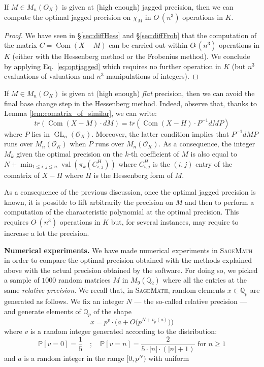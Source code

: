 \documentclass{sig-alternate-05-2015}
\DeclareMathOperator{\GL}{GL}
\DeclareMathOperator{\val}{val}
\DeclareMathOperator{\com}{Com}
\newcommand{\Q}{\mathbb Q}
\newcommand{\OK}{\mathcal{O}_K}
\newcommand{\softO}{O\tilde{~}}
\begin{document}
\begin{prop} \label{prop:optimal_jagged}
If $M \in M_n(O_K)$ is given at (high enough) jagged precision, 
then we can compute the optimal jagged precision on $\chi_M$ in 
$\softO (n^3)$ operations in $K$.
\end{prop}

\begin{proof}
We have seen in \S \ref{sec:diffHess} and \S \ref{sec:diffFrob}
that the computation of the matrix $C = \com(X{-}M)$ can be carried out 
within $\softO(n^3)$ operations in $K$ (either with the Hessenberg 
method or the Frobenius method). We conclude by applying 
Eq.~\eqref{eq:optjagged} which requires no further operation in $K$
(but $n^3$ evaluations of valuations and $n^3$ manipulations of 
integers).
\end{proof}

\begin{rem}
If $M \in M_n(O_K)$ is given at (high enough) \emph{flat} precision, 
then we can avoid the final base change step in the Hessenberg method.
Indeed, observe that, thanks to Lemma \ref{lem:comatrix_of_similar}, 
we can write:
$$tr(\com (X{-}M) \cdot dM)=tr(\com (X{-}H)\cdot P^{-1} dM P)$$
where $P$ lies in $\GL_n(\OK)$. Moreover, the latter condition implies
that $P^{-1} dM P$ runs over $M_n(\OK)$ when $P$ runs over $M_n(\OK)$.
As a consequence, the integer $M_k$ given the optimal precision on the 
$k$-th coefficient of $M$ is also equal to
$N + \min_{1 \leq i, j\leq n} \val(\pi_k(C^H_{i,j}))$
where $C^H_{i,j}$ is the $(i,j)$ entry of the comatrix of $X{-}H$
where $H$ is the Hessenberg form of $M$.
\end{rem}

As a consequence of the previous discussion, once the optimal jagged 
precision is known, it is possible to lift arbitrarily the precision on 
$M$ and then to perform a computation of the characteristic polynomial 
at the optimal precision. This requires $\softO(n^3)$ operations in $K$ 
but, for several instances, may require to increase a lot the precision.

\medskip

\noindent
{\bf Numerical experiments.}
We have made numerical experiments in \textsc{SageMath}~\cite{sage}
in order to compare the optimal precision obtained with the methods
explained above with the actual precision obtained by the software.
For doing so, we picked a sample of $1000$ random matrices $M$ in 
$M_9(\Q_2)$ where all the entries at the same \emph{relative
precision}.
We recall that, in \textsc{SageMath}, random elements $x \in \Q_p$ are 
generated as follows. We fix an integer $N$ --- the so-called relative
precision --- and generate elements of $\Q_p$ of the shape
$$x = p^v \cdot \big(a + O\big(p^{N+v_p(a)}\big)\big)$$
where $v$ is a random integer generated according to the distribution:
$$\mathbb P [v = 0] = \frac 1 5 \quad ; \quad
\mathbb P [v = n] = \frac 2 {5\cdot |n| \cdot (|n|+1)} \text{ for }
n \geq 1$$
and $a$ is a random integer in the range $[0, p^N)$ with uniform
\end{document}
